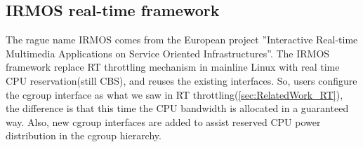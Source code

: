 \subsection{IRMOS real-time framework}
The rague name IRMOS comes from the European project ''Interactive Real-time
Multimedia Applications on Service Oriented Infrastructures''. 
The IRMOS 
framework replace RT throttling mechanism in mainline Linux with real time
CPU reservation(still CBS), and reuses the existing interfaces. So, users 
configure the cgroup interface as what we saw in RT 
throttling(\ref{sec:RelatedWork_RT}), the difference is that this time the CPU 
bandwidth is allocated in a guaranteed way. Also, new cgroup interfaces are 
added to assist reserved CPU power distribution in the cgroup hierarchy.

